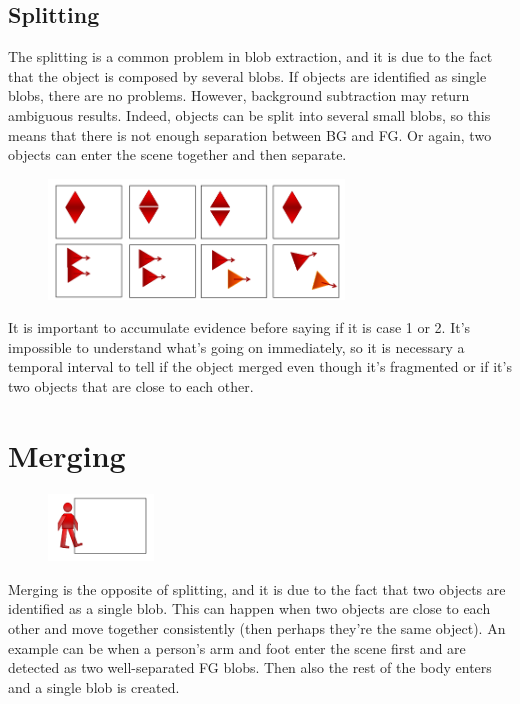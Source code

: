 \subsection{Splitting}
The splitting is a common problem in blob extraction, and it is due to the fact that the object is composed by several blobs. If objects are identified as single blobs, there are no problems. However, background subtraction may return ambiguous results. 
Indeed, objects can be split into several small blobs, so this means that there is not enough separation between BG and FG. Or again, two objects can enter the scene together and then separate.
\begin{figure}[h]
    \centering
    \includegraphics[width=0.7\textwidth]{Figures/Splitting.png}
\end{figure}

It is important to accumulate evidence before saying if it is case 1 or 2. It's impossible to understand what's going on immediately, so it is necessary a temporal interval to tell if the object merged even though it's fragmented or if it's two objects that are close to each other.

\section{Merging}
\begin{figure}
    \centering
    \includegraphics[width=0.25\textwidth]{Figures/Merging.png}
\end{figure}
Merging is the opposite of splitting, and it is due to the fact that two objects are identified as a single blob. This can happen when two objects are close to each other and move together consistently (then perhaps they're the same object).
An example can be when a person’s arm and foot enter the scene first and are detected as two well-separated FG blobs. 
Then also the rest of the body enters and a single blob is created. 


